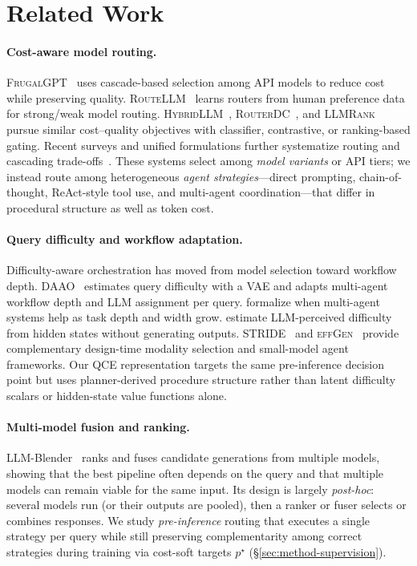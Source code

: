 \section{Related Work}
\label{sec:related-work}

\paragraph{Cost-aware model routing.}
\textsc{FrugalGPT}~\citep{chen2024frugalgpt} uses cascade-based selection among API models to reduce cost while preserving quality.
\textsc{RouteLLM}~\citep{ong2025routellm} learns routers from human preference data for strong/weak model routing.
\textsc{HybridLLM}~\citep{ding2024hybridllm}, \textsc{RouterDC}~\citep{chen2024routerdc}, and \textsc{LLMRank}~\citep{agrawal2025llmrank} pursue similar cost--quality objectives with classifier, contrastive, or ranking-based gating.
Recent surveys and unified formulations further systematize routing and cascading trade-offs~\citep{moslem2026routing_survey,dekoninck2025cascade_routing}.
These systems select among \emph{model variants} or API tiers; we instead route among
heterogeneous \emph{agent strategies}---direct prompting, chain-of-thought, ReAct-style
tool use, and multi-agent coordination---that differ in procedural structure as well as
token cost.

\paragraph{Query difficulty and workflow adaptation.}
Difficulty-aware orchestration has moved from model selection toward workflow depth.
\textsc{DAAO}~\citep{su2026daao} estimates query difficulty with a VAE and adapts multi-agent workflow depth and LLM assignment per query.
\citet{tang2025task_complexity_mas} formalize when multi-agent systems help as task depth and width grow.
\citet{zhu2025llm_already_knows} estimate LLM-perceived difficulty from hidden states without generating outputs.
\textsc{STRIDE}~\citep{asthana2025stride} and \textsc{effGen}~\citep{srivastava2026effgen} provide complementary design-time modality selection and small-model agent frameworks.
Our QCE representation targets the same pre-inference decision point but uses planner-derived procedure structure rather than latent difficulty scalars or hidden-state value functions alone.

\paragraph{Multi-model fusion and ranking.}
LLM-Blender~\citep{jiang2023llmblender} ranks and fuses candidate generations from multiple
models, showing that the best pipeline often depends on the query and that multiple models
can remain viable for the same input.
Its design is largely \emph{post-hoc}: several models run (or their outputs are pooled),
then a ranker or fuser selects or combines responses.
We study \emph{pre-inference} routing that executes a single strategy per query while still
preserving complementarity among correct strategies during training via cost-soft targets
$p^\star$ (\S\ref{sec:method-supervision}).

